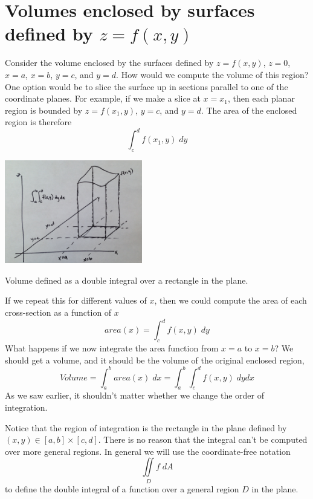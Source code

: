 \documentclass{tufte-handout}
\begin{document}
\section{Volumes enclosed by surfaces defined by $z=f(x,y)$}

Consider the volume enclosed by the surfaces defined by $z=f(x,y)$, $z = 0$, $x=a$, $x=b$, $y=c$, and $y=d$.
How would we compute the volume of this region? One option would be to slice the surface up in sections parallel to one of the coordinate planes. For example, if we make a slice at $x=x_1$, then each planar region is bounded by $z = f(x_1,y)$, $y=c$, and $y=d$. The area of the enclosed region is therefore
\[ \int_c^d f(x_1,y) \; dy \]

\begin{marginfigure}
\includegraphics[width=6cm]{figs/volumerectangular}
\caption{Volume defined as a double integral over a rectangle in the plane.}
\end{marginfigure}

If we repeat this for different values of $x$, then we could compute the area of each cross-section as a function of $x$
\[ area(x) = \int_c^d f(x,y) \; dy \]
What happens if we now integrate the area function from $x=a$ to $x=b$? We should get a volume, and it should be the volume of the original enclosed region,
\[ Volume = \int_a^b area(x) \; dx = \int_a^b \int_c^d f(x,y) \; dy dx \]
As we saw earlier, it shouldn't matter whether we change the order of integration.

Notice that the region of integration is the rectangle in the plane defined by $(x,y) \in [a,b] \times [c,d]$. There is no reason that the integral can't be computed over more general regions. In general we will use the coordinate-free notation
\[ \iint\limits_D f \; dA \]
to define the double integral of a function over a general region $D$ in the plane.
\end{document}
